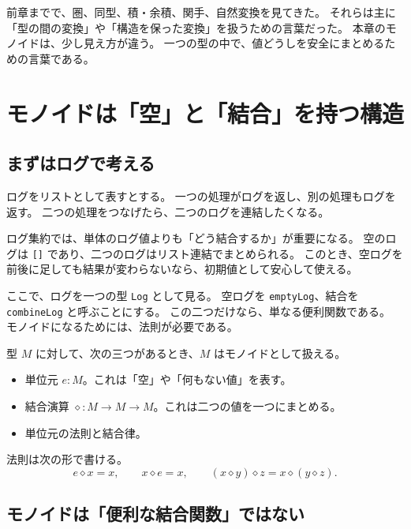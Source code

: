 
前章までで、圏、同型、積・余積、関手、自然変換を見てきた。
それらは主に「型の間の変換」や「構造を保った変換」を扱うための言葉だった。
本章のモノイドは、少し見え方が違う。
一つの型の中で、値どうしを安全にまとめるための言葉である。

\section{モノイドは「空」と「結合」を持つ構造}

\subsection{まずはログで考える}

ログをリストとして表すとする。
一つの処理がログを返し、別の処理もログを返す。
二つの処理をつなげたら、二つのログを連結したくなる。

\begin{softwarebox}
ログ集約では、単体のログ値よりも「どう結合するか」が重要になる。
空のログは \texttt{[]} であり、二つのログはリスト連結でまとめられる。
このとき、空ログを前後に足しても結果が変わらないなら、初期値として安心して使える。
\end{softwarebox}

ここで、ログを一つの型 \texttt{Log} として見る。
空ログを \texttt{emptyLog}、結合を \texttt{combineLog} と呼ぶことにする。
この二つだけなら、単なる便利関数である。
モノイドになるためには、法則が必要である。

\begin{definitionbox}
型 \(M\) に対して、次の三つがあるとき、\(M\) はモノイドとして扱える。
\begin{itemize}
\item 単位元 \(e : M\)。これは「空」や「何もない値」を表す。
\item 結合演算 \(\diamond : M \to M \to M\)。これは二つの値を一つにまとめる。
\item 単位元の法則と結合律。
\end{itemize}
法則は次の形で書ける。
\[
  e \diamond x = x, \qquad
  x \diamond e = x, \qquad
  (x \diamond y) \diamond z = x \diamond (y \diamond z).
\]
\end{definitionbox}

\subsection{モノイドは「便利な結合関数」ではない}

